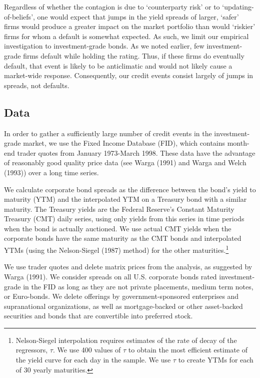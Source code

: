 \documentclass[titlepage,11pt]{article}
\begin{document}
Regardless of whether the contagion is due to `counterparty risk' or to
`updating-of-beliefs', one would expect that jumps in the yield spreads of
larger,
`safer' firms would produce a greater impact on the market portfolio than would
`riskier' firms for whom a default is somewhat expected.
As such, we limit our empirical investigation to investment-grade bonds.  As we
noted earlier, few investment-grade firms default while holding the rating.
Thus, if these firms do eventually default, that event is likely to be
anticlimatic and would not likely cause a market-wide response. Consequently,
our credit events consist largely of jumps in spreads, not defaults.

\subsection{Data}
In order to gather a sufficiently large number of credit events in
the investment-grade market, we use the Fixed Income Database (FID),
which contains month-end trader quotes from January 1973-March 1998.
These data have the advantage of reasonably good quality price data
(see Warga (1991) and Warga and Welch (1993)) over a long time series.

We calculate corporate bond spreads as the difference between the
bond's yield to maturity (YTM) and the interpolated YTM on a
Treasury bond with a similar maturity. The Treasury yields are the
Federal Reserve's Constant Maturity Treasury (CMT) daily series, using
only yields from this series in time periods when the bond is actually
auctioned. We use actual
CMT yields when the corporate bonds have the same maturity as the CMT bonds
and interpolated YTMs (using the Nelson-Siegel (1987) method) for the
other maturities.\footnote{Nelson-Siegel interpolation requires estimates
of the rate of decay of the regressors, $\tau$.  We use 400 values of $\tau$ to
obtain the most efficient
estimate of the yield curve for each day in the sample. We use $\tau$ to create
YTMs for each of 30 yearly maturities.}

We use trader quotes and delete matrix
prices from the analysis, as suggested by Warga (1991). We consider spreads on
all U.S. corporate
bonds rated investment-grade in the FID as long as they are not
private placements, medium term notes, or Euro-bonds. We delete
offerings by government-sponsored enterprises and supranational
organizations, as well as mortgage-backed or other asset-backed
securities and bonds that are convertible into preferred stock.
\end{document}
